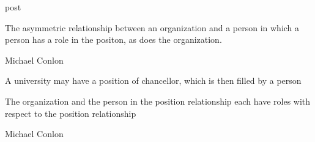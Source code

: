 \documentclass[letterpaper,10pt,english]{sphinxmanual}
\begin{document}
\begin{sphinxShadowBox}

\sphinxAtStartPar
post
\end{sphinxShadowBox}

\begin{sphinxShadowBox}

\sphinxAtStartPar
{\hyperref[\detokenize{doc-BFO_0000003::doc}]{}}
\end{sphinxShadowBox}

\begin{sphinxShadowBox}

\sphinxAtStartPar
The asymmetric relationship between an organization and a person in which a person has a role in the positon, as does the organization.
\end{sphinxShadowBox}

\begin{sphinxShadowBox}

\sphinxAtStartPar
Michael Conlon 
\end{sphinxShadowBox}

\begin{sphinxShadowBox}

\sphinxAtStartPar
A university may have a position of chancellor, which is then filled by a person
\end{sphinxShadowBox}

\begin{sphinxShadowBox}

\sphinxAtStartPar
The organization and the person in the position relationship each have roles with respect to the position relationship
\end{sphinxShadowBox}

\begin{sphinxShadowBox}

\sphinxAtStartPar
{}
\end{sphinxShadowBox}

\begin{sphinxShadowBox}

\sphinxAtStartPar
Michael Conlon 
\end{sphinxShadowBox}
\begin{quote}

\ignorespaces \end{quote}
\end{document}
